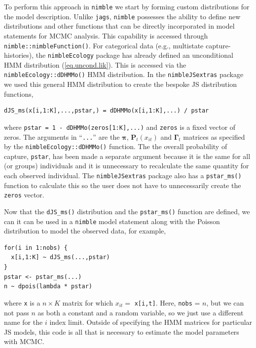 \documentclass[12pt]{article}
\newcommand{\bP}{\ensuremath{\mathbf{P}}}
\newcommand{\bpi}{\ensuremath{\boldsymbol{\pi}}}
\newcommand{\bG}{\ensuremath{\boldsymbol{\Gamma}}}
\begin{document}
To perform this approach in \verb|nimble| we start by forming custom distributions for the model description. Unlike {\tt jags}, \verb|nimble| possesses the ability to define new distributions and other functions that can be directly incorporated in model statements for MCMC analysis. This capability is accessed through {\tt nimble::nimbleFunction()}. For categorical data (e.g., multistate capture-histories), the {\tt nimbleEcology} package has already defined an unconditional HMM distribution (\ref{eq.uncond.lik}). This is accessed via the {\tt nimbleEcology::dDHMMo()} HMM distribution. In the {\tt nimbleJSextras} package we used this general HMM distribution to create the bespoke JS distribution functions,
\begin{verbatim}
dJS_ms(x[i,1:K],...,pstar,) = dDHMMo(x[i,1:K],...) / pstar
\end{verbatim}
where {\tt pstar = 1 - dDHMMo(zeros[1:K],...)} and {\tt zeros} is a fixed vector of zeros. The arguments in ``{\tt ...}'' are the $\bpi$, $\bP_t(x_{it})$ and $\bG_t$ matrices as specified by the {\tt nimbleEcology::dDHMMo()} function. The the overall probability of capture, {\tt pstar}, has been made a separate argument because it is the same for all (or groups) individuals and it is unnecessary to recalculate the same quantity for each observed individual. The {\tt nimbleJSextras} package also has a \verb|pstar_ms()| function to calculate this so the user does not have to unnecessarily create the {\tt zeros} vector. 

Now that the \verb|dJS_ms()| distribution and the \verb|pstar_ms()| function are defined, we can it can be used in a \verb|nimble| model statement along with the Poisson distribution to model the observed data, for example,
\begin{verbatim}
for(i in 1:nobs) {
  x[i,1:K] ~ dJS_ms(...,pstar)
}
pstar <- pstar_ms(...)
n ~ dpois(lambda * pstar)
\end{verbatim}
where \verb|x| is a $n\times K$ matrix for which $x_{it} = $ \verb|x[i,t]|. Here, {\tt nobs} = $n$, but we can not pass $n$ as both a constant and a random variable, so we just use a different name for the $i$ index limit. Outside of specifying the HMM matrices for particular JS models, this code is all that is necessary to estimate the model parameters with MCMC. 
\end{document}
